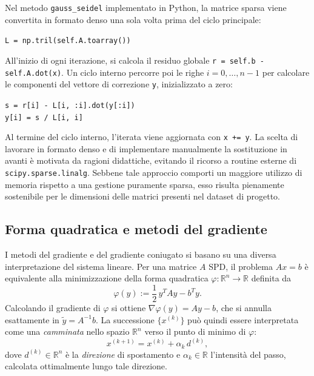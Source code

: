 \documentclass[a4paper,12pt]{article}
\begin{document}
\begin{implbox}
Nel metodo \texttt{gauss\_seidel} implementato in Python, la matrice sparsa viene
convertita in formato denso una sola volta prima del ciclo principale:
\begin{center}
    \texttt{L = np.tril(self.A.toarray())}
\end{center}
All'inizio di ogni iterazione, si calcola il residuo globale
\texttt{r = self.b - self.A.dot(x)}. Un ciclo interno percorre poi le righe
$i = 0, \ldots, n-1$ per calcolare le componenti del vettore di correzione \texttt{y},
inizializzato a zero:
\begin{center}
    \texttt{s = r[i] - L[i, :i].dot(y[:i])} \\[2pt]
    \texttt{y[i] = s / L[i, i]}
\end{center}
Al termine del ciclo interno, l'iterata viene aggiornata con \texttt{x += y}. La
scelta di lavorare in formato denso e di implementare manualmente la sostituzione in
avanti è motivata da ragioni didattiche, evitando il ricorso a routine esterne di
\texttt{scipy.sparse.linalg}. Sebbene tale approccio comporti un maggiore utilizzo di
memoria rispetto a una gestione puramente sparsa, esso risulta pienamente sostenibile
per le dimensioni delle matrici presenti nel dataset di progetto.
\end{implbox}

\subsection{Forma quadratica e metodi del gradiente}
 
I metodi del gradiente e del gradiente coniugato si basano su una diversa
interpretazione del sistema lineare. Per una matrice $A$ SPD, il problema
$Ax = b$ è equivalente alla minimizzazione della forma quadratica
$\varphi : \mathbb{R}^n \to \mathbb{R}$ definita da
\begin{equation}
    \varphi(y) := \frac{1}{2}\, y^T A y - b^T y.
    \label{eq:phi}
\end{equation}
Calcolando il gradiente di $\varphi$ si ottiene $\nabla\varphi(y) = Ay - b$,
che si annulla esattamente in $\widetilde{y} = A^{-1}b$.
La successione $\{x^{(k)}\}$ può quindi essere interpretata come una
\emph{camminata} nello spazio $\mathbb{R}^n$ verso il punto di minimo di $\varphi$:
\begin{equation}
    x^{(k+1)} = x^{(k)} + \alpha_k \, d^{(k)},
\end{equation}
dove $d^{(k)} \in \mathbb{R}^n$ è la \emph{direzione} di spostamento e
$\alpha_k \in \mathbb{R}$ l'intensità del passo, calcolata ottimalmente
lungo tale direzione.
 
\end{document}

